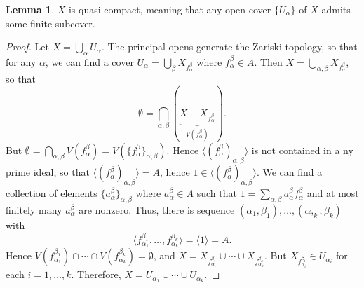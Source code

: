 \documentclass[10pt,letterpaper,cm]{nupset}
\theoremstyle{definition}
\theoremstyle{theorem}
\newtheorem{lemma}[definition]{Lemma}
\theoremstyle{remark}
\newcommand{\1}{\mathbf{1}}
\newcommand{\0}{\vec 0}
\begin{document}
\medskip

\begin{lemma}
$X$ is quasi-compact, meaning that any open cover $\{U_{\alpha}\}$ of $X$ admits some finite subcover. 
\end{lemma}
\begin{proof}
Let $X = \bigcup_{\alpha} U_{\alpha}$. The principal opens generate the Zariski topology, so that for any $\alpha$, we can find a cover $U_{\alpha} = \bigcup_{\beta} X_{f_{\alpha}^{\beta}}$ where $f_{\alpha}^{\beta}\in A$. Then $X = \bigcup_{\alpha, \beta} X_{f_{\alpha}^{\beta}}$, so that $$\emptyset = \bigcap_{\alpha, \beta}(\underbrace{X - X_{f_{\alpha}^{\beta}}}_{V({f_{\alpha}^{\beta}})}).$$ But $\emptyset = \bigcap_{\alpha, \beta} V({f_{\alpha}^{\beta}})= V(\{ {f_{\alpha}^{\beta}} \}_{\alpha, \beta})$. Hence $\langle ({f_{\alpha}^{\beta}})_{\alpha, \beta} \rangle$ is not contained in a ny prime ideal, so that $\langle ({f_{\alpha}^{\beta}})_{\alpha, \beta} \rangle =A$, hence $1\in \langle ({f_{\alpha}^{\beta}})_{\alpha, \beta} \rangle$. We can find a collection of elements $\{a_{\alpha}^{\beta} \}_{\alpha, \beta}$ where $a_{\alpha}^{\beta} \in A$ such that $1= \sum_{\alpha, \beta} a_{\alpha}^{\beta} f_{\alpha}^{\beta}$ and at most finitely many $a_{\alpha}^{\beta}$ are nonzero. Thus, there is sequence $(\alpha_1, \beta_1), \ldots, (\alpha,_k , \beta_k)$ with $$\langle f_{\alpha_1}^{\beta_1}, \ldots, f_{\alpha_k}^{\beta_k} \rangle = \langle 1 \rangle = A.$$ Hence $V(f_{\alpha_1}^{\beta_1}) \cap \cdots \cap V(f_{\alpha_k}^{\beta_k}) = \emptyset$, and $X = X_{f_{\alpha_1}^{\beta_1}} \cup \cdots \cup X_{f_{\alpha_k}^{\beta_k}}$. But $X_{f_{\alpha_i}^{\beta_i}} \in U_{\alpha_i}$ for each $i=1, \ldots, k$. Therefore, $X= U_{\alpha_1} \cup \cdots \cup U_{\alpha_k}$.
\end{proof}
\end{document}
